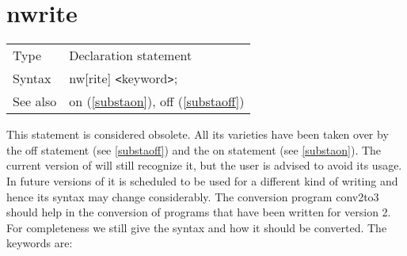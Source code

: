 \section{nwrite}
\label{substanwrite}

\noindent \begin{tabular}{ll}
Type & Declaration statement\\
Syntax & nw[rite] {\tt<}keyword{\tt>};
\\ See also & on (\ref{substaon}), off (\ref{substaoff})
\end{tabular} \vspace{4mm}

\noindent This statement is considered 
obsolete. All its varieties have been taken over by the 
off statement (see \ref{substaoff}) and the on 
statement (see \ref{substaon}). The current version of {\FORM} will still 
recognize it, but the user is advised to avoid its usage. In future 
versions of {\FORM} it is scheduled to be used for a different kind of 
writing and hence its syntax may change considerably. The conversion 
program conv2to3 should help in the conversion of programs 
that have been written for version 2. For completeness we still give the 
syntax and how it should be converted.
The keywords are: \vspace{4mm}










